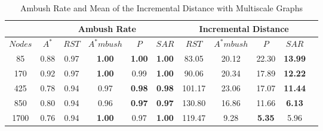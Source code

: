 \begin{table}[h]
\caption{Ambush Rate and Mean of the Incremental Distance 
		 with Multiscale Graphs}
\begin{center}

\begin{tabular}{|c|c|c|c|c|c||c|c|c|c|c|}
\hline
& \multicolumn{5}{|c||}{\textbf{Ambush Rate}} &
  \multicolumn{4}{|c|}{\textbf{Incremental Distance}}\\
\hline
  $Nodes$ & $A^*$ & $RST$ & $A^*mbush$ & $P$ & $SAR$
		  		  & $RST$ & $A^*mbush$ & $P$ & $SAR$\\
\hline
   85 & 0.88 & 0.97 & \textbf{1.00} & \textbf{1.00} & \textbf{1.00}
      & 83.05 & 20.12 & 22.30 & \textbf{13.99}\\
  170 & 0.92 & 0.97 & \textbf{1.00} & 0.99 & \textbf{1.00}
	  & 90.06 & 20.34 & 17.89 & \textbf{12.22}\\
  425 & 0.78 & 0.94 & 0.97 & \textbf{0.98} & \textbf{0.98}
	  & 101.17 & 23.06 & 17.07 & \textbf{11.44}\\
  850 & 0.80 & 0.94 & 0.96 & \textbf{0.97} & \textbf{0.97}
	  & 130.80 & 16.86 & 11.66 & \textbf{6.13}\\
 1700 & 0.76 & 0.94 & \textbf{1.00} & 0.97 & \textbf{1.00}
	  & 119.47 & 9.28 & \textbf{5.35} & 5.96\\
\hline
\end{tabular}

\label{tab:multiscale}
\end{center}
\end{table}
